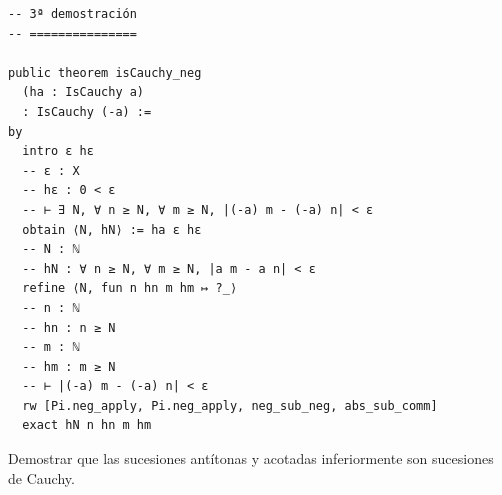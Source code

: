 \begin{verbatim}
-- 3ª demostración
-- ===============

public theorem isCauchy_neg
  (ha : IsCauchy a)
  : IsCauchy (-a) :=
by
  intro ε hε
  -- ε : X
  -- hε : 0 < ε
  -- ⊢ ∃ N, ∀ n ≥ N, ∀ m ≥ N, |(-a) m - (-a) n| < ε
  obtain ⟨N, hN⟩ := ha ε hε
  -- N : ℕ
  -- hN : ∀ n ≥ N, ∀ m ≥ N, |a m - a n| < ε
  refine ⟨N, fun n hn m hm ↦ ?_⟩
  -- n : ℕ
  -- hn : n ≥ N
  -- m : ℕ
  -- hm : m ≥ N
  -- ⊢ |(-a) m - (-a) n| < ε
  rw [Pi.neg_apply, Pi.neg_apply, neg_sub_neg, abs_sub_comm]
  exact hN n hn m hm
\end{verbatim}

\begin{ejercicio}
  Demostrar que las sucesiones antítonas y acotadas inferiormente
  son sucesiones de Cauchy.
\end{ejercicio}

